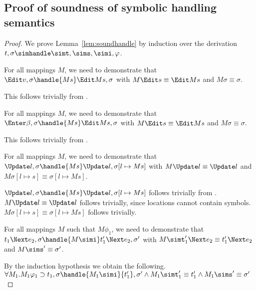 \subsection{Proof of soundness of symbolic handling semantics}

\label{appendix:symbolicsoundhandle}
\begin{proof}
  We prove Lemma~\ref{lem:soundhandle} by induction over the derivation $t,\sigma\simhandle\simt,\sims,\simi,\phi$.

    {
    For all mappings $M$, we need to demonstrate that $\Edit v,\sigma\handle{M s}\Edit M s,\sigma$ with $M\Edit s\equiv \Edit M s$ and $ M\sigma\equiv {\sigma}$.

    This follows trivially from .

    }

  {For all mappings $M$, we need to demonstrate that
  $\Enter\beta,\sigma\handle{M s} \Edit M s,\sigma$ with
  $M \Edit s \equiv \Edit M s$ and $ M\sigma\equiv {\sigma}$.

  This follows trivially from .

  }

  {
  For all mappings $M$,
  we need to demonstrate that\\
  $\Update l,\sigma\handle{M s}\Update l,\sigma[l\mapsto M s]$ with
  $M \Update l \equiv \Update l$ and $ M\sigma[l\mapsto s]\equiv {\sigma}[l\mapsto M s]$.

  $\Update l,\sigma\handle{M s}\Update l,\sigma[l\mapsto M s]$ follows trivially from .
  $M \Update l \equiv \Update l$ follows trivially, since locations cannot contain symbols.
  $ M\sigma[l\mapsto s]\equiv {\sigma}[l\mapsto M s]$ follows trivially.

  }


  {For all mappings $M$ such that $M\phi_1$, we need to demonstrate that\\
  $t_1\Next e_2,\sigma\handle{M \simi} t_1'\Next e_2,\sigma'$ with
  $M \simt_1' \Next e_2 \equiv {t_1'}\Next e_2$ and $M\sims'\equiv{\sigma'}$.

  By the induction hypothesis we obtain the following.\\
  $\forall M_1 . M_1 \phi_1 \implies t_1,\sigma \handle{M_1 \simi} {t_1'},{\sigma'}\land M_1 \simt_1'\equiv{t_1'}\land M_1\sims' \equiv {\sigma'}$

}
\end{proof}
